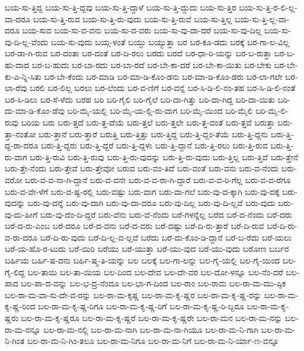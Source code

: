 {ಬಯ-ಸು-ತ್ತಿದ್ದ
ಬಯ-ಸು-ತ್ತಿ-ದ್ದವು
ಬಯ-ಸು-ತ್ತಿ-ದ್ದಾಳೆ
ಬಯ-ಸು-ತ್ತಿ-ದ್ದುದು
ಬಯ-ಸು-ತ್ತಿರ
ಬಯ-ಸು-ತ್ತಿ-ರ-ಲಿ-ಲ್ಲ-ವಾ-ದರೂ
ಬಯ-ಸು-ತ್ತಿ-ರುವ
ಬಯ-ಸು-ತ್ತಿ-ರು-ವುದು
ಬಯ-ಸು-ತ್ತಿ-ರುವೆ
ಬಯ-ಸು-ತ್ತಿಲ್ಲ
ಬಯ-ಸು-ತ್ತಿ-ಲ್ಲ-ವಾ-ದರೂ
ಬಯ-ಸುವ
ಬಯ-ಸು-ವ-ವನು
ಬಯ-ಸು-ವ-ವರು
ಬಯ-ಸು-ವು-ದಾ-ದರೆ
ಬಯ-ಸು-ವು-ದಿಲ್ಲ
ಬಯ-ಸು-ವು-ದಿ-ಲ್ಲ-ವೆಂದು
ಬಯ-ಸು-ವುದು
ಬಯ್ಗ-ಳಂತೆ
ಬಯ್ದು
ಬಯ್ಯುತ್ತಾ
ಬರ
ಬರ-ಕೂ-ಡದು
ಬರಕ್ಕೆ
ಬರ-ಗಾ-ಲ-ವಿಲ್ಲ
ಬರ-ಡಾ-ಗಿ-ರುವ
ಬರ-ದಂತಾ
ಬರ-ದಂತೆ
ಬರ-ದಿ-ರಲು
ಬರದು
ಬರದೆ
ಬರ-ಧಾ-ರಿ-ಯನ್ನು
ಬರ-ಬ-ರುತ್ತಾ
ಬರ-ಬ-ಹು-ದಾದ
ಬರ-ಬ-ಹುದು
ಬರ-ಬಾ-ರದು
ಬರ-ಬಾ-ರದೆ
ಬರ-ಬೇ-ಕಾ-ದರೆ
ಬರ-ಬೇ-ಕಾ-ಯಿತು
ಬರ-ಬೇಕು
ಬರ-ಬೇ-ಕು-ಎ-ನ್ನಿ-ಸಿತು
ಬರ-ಬೇ-ಕೆಂದು
ಬರ-ಮಾಡಿ
ಬರ-ಮಾ-ಡಿ-ಕೊಂ-ಡನು
ಬರ-ಮಾ-ಡಿ-ಕೊಂ-ಡರು
ಬರ-ಲಾ-ಗಲೇ
ಬರ-ಲಾ-ರೆವು
ಬರಲಿ
ಬರ-ಲಿಲ್ಲ
ಬರಲು
ಬರ-ಲೆಂದು
ಬರ-ವ-ಣಿಗೆ
ಬರ-ವನ್ನೆ
ಬರ-ಸಿ-ಡಿ-ಲಿ-ನಂ-ತಹ
ಬರ-ಸಿ-ಡಿ-ಲಿ-ನಂತೆ
ಬರ-ಸಿ-ಡಿಲು
ಬರ-ಸೆ-ಳೆದು
ಬರಹ
ಬರಿ
ಬರಿ-ಗೈಲಿ
ಬರಿ-ಗೈಲೆ
ಬರಿ-ದಾ-ಗಿತ್ತು
ಬರಿ-ದಾ-ಗಿದ್ದ
ಬರಿ-ದಾ-ಯಿತು
ಬರಿ-ದು-ಮಾ-ಡಿ-ಕೊಂ-ಡೆವು
ಬರಿ-ಮೈ-ಯಲ್ಲಿ
ಬರಿ-ಮೈ-ಯ-ಲ್ಲಿ-ರು-ವಾಗ
ಬರಿ-ಮೈ-ಯಿಂದ
ಬರಿ-ಮೈಲಿ
ಬರಿ-ಮೈ-ಲಿ-ರುವು
ಬರಿಯ
ಬರು
ಬರು-ತ್ತದೆ
ಬರು-ತ್ತ-ದೆಯೆ
ಬರು-ತ್ತಲೆ
ಬರು-ತ್ತಲೇ
ಬರು-ತ್ತ-ವಂತೆ
ಬರು-ತ್ತವೆ
ಬರುತ್ತಾ
ಬರು-ತ್ತಾ-ನಂತೋ
ಬರು-ತ್ತಾನೆ
ಬರು-ತ್ತಾರೆ
ಬರುತ್ತಿ
ಬರು-ತ್ತಿತ್ತು
ಬರು-ತ್ತಿದ್ದ
ಬರು-ತ್ತಿ-ದ್ದಂ-ತೆಯೆ
ಬರು-ತ್ತಿ-ದ್ದನು
ಬರು-ತ್ತಿ-ದ್ದ-ರಾ-ದರೂ
ಬರು-ತ್ತಿ-ದ್ದರು
ಬರು-ತ್ತಿ-ದ್ದರೆ
ಬರು-ತ್ತಿ-ದ್ದಳು
ಬರು-ತ್ತಿ-ದ್ದಾನೆ
ಬರು-ತ್ತಿ-ರಲು
ಬರು-ತ್ತಿ-ರುವ
ಬರು-ತ್ತಿ-ರು-ವಾಗ
ಬರು-ತ್ತಿ-ರುವಿ
ಬರು-ತ್ತಿ-ರುವು
ಬರು-ತ್ತಿ-ರು-ವುದನ್ನು
ಬರು-ತ್ತಿ-ರು-ವುದು
ಬರು-ತ್ತಿಲ್ಲ
ಬರು-ತ್ತಿವೆ
ಬರು-ತ್ತೇನೆ
ಬರು-ತ್ತೇ-ನೆಂದು
ಬರು-ತ್ತೇವೆ
ಬರು-ತ್ತೇವೋ
ಬರುವ
ಬರು-ವಂ-ತಿದೆ
ಬರು-ವಂತೆ
ಬರು-ವನು
ಬರು-ವ-ನೆಂದು
ಬರು-ವರೋ
ಬರು-ವ-ವ-ನಾ-ಗಿ-ದ್ದಾನೆ
ಬರು-ವ-ವನೇ
ಬರು-ವ-ವ-ರಾ-ಗಿ-ದ್ದಾರೆ
ಬರು-ವ-ವ-ರಿ-ಗೆಲ್ಲ
ಬರು-ವ-ವ-ರೆಗೂ
ಬರು-ವ-ವೇ-ಳೆಗೆ
ಬರು-ವ-ಷ್ಟ-ರಲ್ಲಿ
ಬರು-ವಷ್ಟು
ಬರು-ವಾಗ
ಬರು-ವಾ-ಗಲೆ
ಬರು-ವು-ದ-ಕ್ಕಾಗಿ
ಬರು-ವು-ದಕ್ಕೆ
ಬರು-ವುದನ್ನು
ಬರು-ವು-ದನ್ನೆ
ಬರು-ವು-ದಾಗಿ
ಬರು-ವು-ದಾ-ದರೂ
ಬರು-ವು-ದಿಲ್ಲ
ಬರು-ವು-ದಿ-ಲ್ಲವೆ
ಬರು-ವುದು
ಬರು-ವು-ದು-ಹೀಗೆ
ಬರು-ವು-ದೆಂ-ದಿ-ದ್ದರೆ
ಬರು-ವೆನು
ಬರು-ವೆ-ನೆಂದು
ಬರೆ-ಗಳನ್ನೆಲ್ಲ
ಬರೆದ
ಬರೆ-ದ-ನೆಂದು
ಬರೆ-ದರು
ಬರೆ-ದ-ರು-ಎಂಬ
ಬರೆ-ದರೂ
ಬರೆ-ದ-ವನು
ಬರೆ-ದ-ವರು
ಬರೆ-ದಷ್ಟು
ಬರೆ-ದಿ-ರು-ತ್ತಾರೆ
ಬರೆ-ದಿ-ರುವ
ಬರೆ-ದಿ-ರು-ವ-ರಾ-ದರೂ
ಬರೆ-ದಿ-ರು-ವುದು
ಬರೆ-ದಿ-ಲ್ಲ-ವ-ಲ್ಲವೆ
ಬರೆದು
ಬರೆ-ದು-ಕೊಂ-ಡಿ-ದ್ದಾನೆ
ಬರೆ-ಬ-ರೆದು
ಬರೆ-ಯಲು
ಬರೆ-ಯ-ಹೊ-ರ-ಟುದು
ಬರೆ-ಯಿರಿ
ಬರೆಯು
ಬರೆ-ಯುತ್ತಾ
ಬರೆ-ಯು-ವುದ
ಬರೆ-ಯು-ವುದು
ಬರೋಣ
ಬರ್ಬರ
ಬರ್ಹಿಯ
ಬರ್ಹಿ-ಷ-ದನು
ಬರ್ಹಿ-ಷ್ಮ-ತಿ-ಯನ್ನು
ಬಲ
ಬಲಕ್ಕೆ
ಬಲ-ಗಾ-ಲನ್ನು
ಬಲ-ಗೈ-ಯಲ್ಲಿ
ಬಲ-ಗೈ-ಯಿಂದ
ಬಲ-ಗೈ-ಲಿದ್ದ
ಬಲ-ತಾಯಿ
ಬಲ-ತಾ-ಯಿಯ
ಬಲ-ದಿಂದ
ಬಲ-ದೇವ
ಬಲ-ದೇ-ವರ
ಬಲ-ದೋ-ಳನ್ನೂ
ಬಲ-ನೆಂ-ದರೆ
ಬಲ-ಪಾದ
ಬಲ-ಪಾ-ದ-ವನ್ನು
ಬಲ-ಭ-ದ್ರ-ನೆಂದೂ
ಬಲ-ಭಾ-ಗ-ದಿಂದ
ಬಲ-ರಾಂ
ಬಲ-ರಾಮ
ಬಲ-ರಾ-ಮ-ಮು-ಷ್ಠಿಕ
ಬಲ-ರಾ-ಮ-ವಾ-ಸು-ದೇ-ವ-ರನ್ನು
ಬಲ-ರಾ-ಮ-ಕೃಷ್ಣ
ಬಲ-ರಾ-ಮ-ಕೃ-ಷ್ಣರ
ಬಲ-ರಾ-ಮ-ಕೃ-ಷ್ಣ-ರನ್ನು
ಬಲ-ರಾ-ಮ-ಕೃ-ಷ್ಣ-ರಿಂದ
ಬಲ-ರಾ-ಮ-ಕೃ-ಷ್ಣ-ರಿಗೂ
ಬಲ-ರಾ-ಮ-ಕೃ-ಷ್ಣ-ರಿಗೆ
ಬಲ-ರಾ-ಮ-ಕೃ-ಷ್ಣ-ರಿ-ಬ್ಬರೂ
ಬಲ-ರಾ-ಮ-ಕೃ-ಷ್ಣರು
ಬಲ-ರಾ-ಮ-ಕೃ-ಷ್ಣರೂ
ಬಲ-ರಾ-ಮ-ಕೃ-ಷ್ಣರೆ
ಬಲ-ರಾ-ಮ-ಕೃ-ಷ್ಣರೇ
ಬಲ-ರಾ-ಮನ
ಬಲ-ರಾ-ಮ-ನನ್ನು
ಬಲ-ರಾ-ಮ-ನನ್ನೂ
ಬಲ-ರಾ-ಮ-ನಲ್ಲಿ
ಬಲ-ರಾ-ಮ-ನಾಗಿ
ಬಲ-ರಾ-ಮ-ನಾ-ಗಿಯೂ
ಬಲ-ರಾ-ಮ-ನಿ-ಗಾಗಿ
ಬಲ-ರಾ-ಮ-ನಿ-ಗಿಂತ
ಬಲ-ರಾ-ಮ-ನಿ-ಗಿಂ-ತಲೂ
ಬಲ-ರಾ-ಮ-ನಿಗೂ
ಬಲ-ರಾ-ಮ-ನಿಗೆ
ಬಲ-ರಾ-ಮ-ನಿ-ರ್ಯಾ-ಣ-ವನ್ನೂ
}
